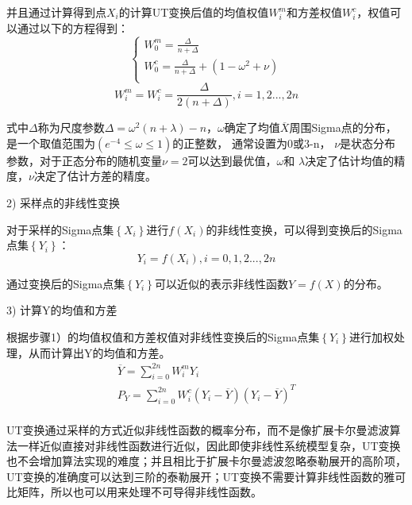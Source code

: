 并且通过计算得到点${{X}_{i}}$的计算UT变换后值的均值权值$W_{i}^{m}$和方差权值$W_{i}^{c}$，权值可以通过以下的方程得到：
\begin{equation}
\left\{ \begin{array}{l}
   W_{0}^{m}=\frac{\Delta }{n+\Delta } \\ 
  W_{0}^{c}=\frac{\Delta }{n+\Delta }+(1-{{\omega }^{2}}+\nu ) \\ 
\end{array} \right.
\end{equation}  
\begin{equation}
W_{i}^{m}=W_{i}^{c}=\frac{\Delta }{2\left( n+\Delta  \right)},i=1,2...,2n
\end{equation}

式中$\Delta $称为尺度参数$\Delta ={{\omega }^{2}}(n+\lambda )-n$，$\omega $确定了均值$\overline{X}$周围Sigma点的分布，是一个取值范围为$\left( {{e}^{-4}}\le \omega \le 1 \right)$的正整数， 通常设置为0或3-n， $\nu $是状态分布参数，对于正态分布的随机变量$\nu =2$可以达到最优值，$\omega $和 $\lambda $决定了估计均值的精度，$\nu $决定了估计方差的精度。

2) 采样点的非线性变换

	对于采样的Sigma点集$\left\{ {{X}_{i}} \right\}$进行$f\left( {{X}_{i}} \right)$的非线性变换，可以得到变换后的Sigma点集$\left\{ {{Y}_{i}} \right\}$：
\begin{equation}
{{Y}_{i}}=f\left( {{X}_{i}} \right),i=0,1,2...,2n
\end{equation}

通过变换后的Sigma点集$\left\{ {{Y}_{i}} \right\}$可以近似的表示非线性函数$Y=f(X)$的分布。

3) 计算Y的均值和方差

根据步骤1）的均值权值和方差权值对非线性变换后的Sigma点集$\left\{ {{Y}_{i}} \right\}$进行加权处理，从而计算出Y的均值和方差。
\begin{equation}\label{3-28}
\begin{array}{l}
   \overline{Y}=\sum\limits_{i=0}^{2n}{W_{i}^{m}{{Y}_{i}}} \\ 
  {{P}_{Y}}=\sum\limits_{i=0}^{2n}{W_{i}^{c}({{Y}_{i}}-\overline{Y}){{({{Y}_{i}}-\overline{Y})}^{T}}} \\ 
\end{array}
\end{equation}

UT变换通过采样的方式近似非线性函数的概率分布，而不是像扩展卡尔曼滤波算法一样近似直接对非线性函数进行近似，因此即使非线性系统模型复杂，UT变换也不会增加算法实现的难度；并且相比于扩展卡尔曼滤波忽略泰勒展开的高阶项，UT变换的准确度可以达到三阶的泰勒展开；UT变换不需要计算非线性函数的雅可比矩阵，所以也可以用来处理不可导得非线性函数。

